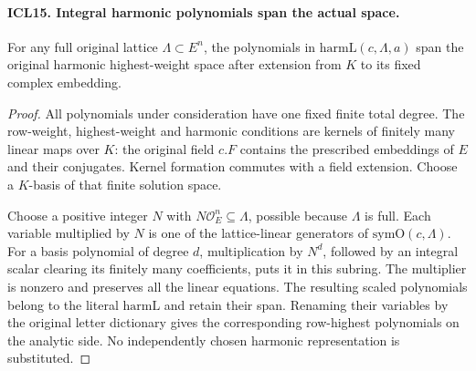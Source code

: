 \paragraph{ICL15. Integral harmonic polynomials span the actual space.}
\label{claim:ICL15}
For any full original lattice \(\Lambda\subset E^n\),
the polynomials in \(\mathrm{harmL}(c,\Lambda,a)\)
span the original harmonic highest-weight space after
extension from \(K\) to its fixed complex embedding.
\begin{proof}
All polynomials under consideration have one fixed
finite total degree.  The row-weight, highest-weight
and harmonic conditions are kernels of finitely many
linear maps over \(K\): the original field \(c.F\)
contains the prescribed embeddings of \(E\) and their
conjugates.  Kernel formation commutes with a field
extension.  Choose a \(K\)-basis of that finite
solution space.

Choose a positive integer \(N\) with
\(N\mathcal O_E^n\subseteq\Lambda\), possible because
\(\Lambda\) is full.  Each variable multiplied by
\(N\) is one of the lattice-linear generators of
\(\mathrm{symO}(c,\Lambda)\).  For a basis polynomial
of degree \(d\), multiplication by \(N^d\), followed
by an integral scalar clearing its finitely many
coefficients, puts it in this subring.  The multiplier
is nonzero and preserves all the linear equations.
The resulting scaled polynomials belong to the
literal \(\mathrm{harmL}\) and retain their span.
Renaming their variables by the original letter
dictionary gives the corresponding row-highest
polynomials on the analytic side.  No independently
chosen harmonic representation is substituted.
\end{proof}

